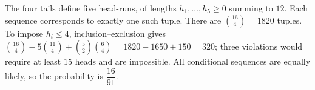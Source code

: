 The four tails define five head-runs, of lengths $h_1,\ldots,h_5\ge0$ summing to $12$. Each sequence corresponds to exactly one such tuple. There are $\binom{16}{4}=1820$ tuples. To impose $h_i\le4$, inclusion--exclusion gives $\binom{16}{4}-5\binom{11}{4}+\binom52\binom64=1820-1650+150=320$; three violations would require at least $15$ heads and are impossible. All conditional sequences are equally likely, so the probability is $\boxed{\dfrac{16}{91}}$.
